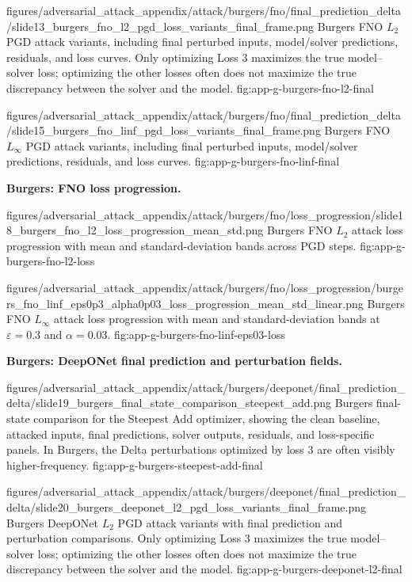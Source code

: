 ﻿\documentclass[letterpaper]{article} %
\begin{document}
\clearpage

\appendixattackfigcompact
  {figures/adversarial_attack_appendix/attack/burgers/fno/final_prediction_delta/slide13_burgers_fno_l2_pgd_loss_variants_final_frame.png}
  {Burgers FNO $L_2$ PGD attack variants, including final perturbed inputs,
  model/solver predictions, residuals, and loss curves. Only optimizing Loss 3
  maximizes the true model--solver loss; optimizing the other losses often does
  not maximize the true discrepancy between the solver and the model.}
  {fig:app-g-burgers-fno-l2-final}

\appendixattackfigcompact
  {figures/adversarial_attack_appendix/attack/burgers/fno/final_prediction_delta/slide15_burgers_fno_linf_pgd_loss_variants_final_frame.png}
  {Burgers FNO $L_\infty$ PGD attack variants, including final perturbed
  inputs, model/solver predictions, residuals, and loss curves.}
  {fig:app-g-burgers-fno-linf-final}

\clearpage

\noindent\textbf{Burgers: FNO loss progression.}

\appendixattackfig
  {figures/adversarial_attack_appendix/attack/burgers/fno/loss_progression/slide18_burgers_fno_l2_loss_progression_mean_std.png}
  {Burgers FNO $L_2$ attack loss progression with mean and standard-deviation
  bands across PGD steps.}
  {fig:app-g-burgers-fno-l2-loss}

\appendixattackfig
  {figures/adversarial_attack_appendix/attack/burgers/fno/loss_progression/burgers_fno_linf_eps0p3_alpha0p03_loss_progression_mean_std_linear.png}
  {Burgers FNO $L_\infty$ attack loss progression with mean and
  standard-deviation bands at $\varepsilon=0.3$ and $\alpha=0.03$.}
  {fig:app-g-burgers-fno-linf-eps03-loss}

\FloatBarrier
\noindent\textbf{Burgers: DeepONet final prediction and perturbation fields.}


\appendixattackfig
  {figures/adversarial_attack_appendix/attack/burgers/deeponet/final_prediction_delta/slide19_burgers_final_state_comparison_steepest_add.png}
  {Burgers final-state comparison for the Steepest Add optimizer, showing the
  clean baseline, attacked inputs, final predictions, solver outputs, residuals,
  and loss-specific panels. In Burgers, the Delta perturbations optimized by
  loss 3 are often visibly higher-frequency.}
  {fig:app-g-burgers-steepest-add-final}

\appendixattackfigcompact
  {figures/adversarial_attack_appendix/attack/burgers/deeponet/final_prediction_delta/slide20_burgers_deeponet_l2_pgd_loss_variants_final_frame.png}
  {Burgers DeepONet $L_2$ PGD attack variants with final prediction and
  perturbation comparisons. Only optimizing Loss 3 maximizes the true
  model--solver loss; optimizing the other losses often does not maximize the
  true discrepancy between the solver and the model.}
  {fig:app-g-burgers-deeponet-l2-final}
\end{document}
